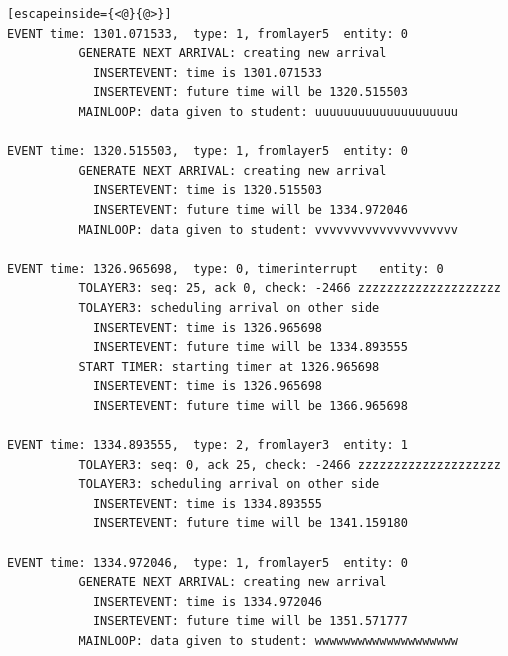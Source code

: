 \documentclass[paper=a4, fontsize=11pt]{scrartcl}
\numberwithin{equation}{section}		%
\numberwithin{figure}{section}			%
\numberwithin{table}{section}				%
\begin{document}
\begin{lstlisting}[escapeinside={<@}{@>}]
EVENT time: 1301.071533,  type: 1, fromlayer5  entity: 0
          GENERATE NEXT ARRIVAL: creating new arrival
            INSERTEVENT: time is 1301.071533
            INSERTEVENT: future time will be 1320.515503
          MAINLOOP: data given to student: uuuuuuuuuuuuuuuuuuuu

EVENT time: 1320.515503,  type: 1, fromlayer5  entity: 0
          GENERATE NEXT ARRIVAL: creating new arrival
            INSERTEVENT: time is 1320.515503
            INSERTEVENT: future time will be 1334.972046
          MAINLOOP: data given to student: vvvvvvvvvvvvvvvvvvvv

EVENT time: 1326.965698,  type: 0, timerinterrupt   entity: 0
          TOLAYER3: seq: 25, ack 0, check: -2466 zzzzzzzzzzzzzzzzzzzz
          TOLAYER3: scheduling arrival on other side
            INSERTEVENT: time is 1326.965698
            INSERTEVENT: future time will be 1334.893555
          START TIMER: starting timer at 1326.965698
            INSERTEVENT: time is 1326.965698
            INSERTEVENT: future time will be 1366.965698

EVENT time: 1334.893555,  type: 2, fromlayer3  entity: 1
          TOLAYER3: seq: 0, ack 25, check: -2466 zzzzzzzzzzzzzzzzzzzz
          TOLAYER3: scheduling arrival on other side
            INSERTEVENT: time is 1334.893555
            INSERTEVENT: future time will be 1341.159180

EVENT time: 1334.972046,  type: 1, fromlayer5  entity: 0
          GENERATE NEXT ARRIVAL: creating new arrival
            INSERTEVENT: time is 1334.972046
            INSERTEVENT: future time will be 1351.571777
          MAINLOOP: data given to student: wwwwwwwwwwwwwwwwwwww


\end{lstlisting}
\end{document}
